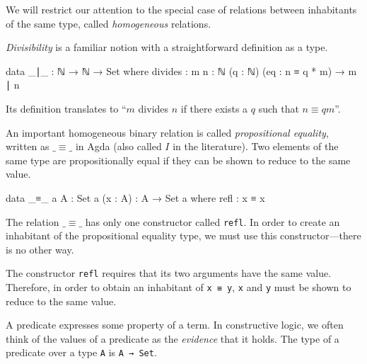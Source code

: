 We will restrict our attention to the special case of relations between inhabitants of the same type, called \emph{homogeneous} relations.

\emph{Divisibility} is a familiar notion with a straightforward definition as a type.

\begin{listing}[h]
\begin{agdacode}
data _∣_ : ℕ → ℕ → Set where
  divides : {m n : ℕ} (q : ℕ) (eq : n ≡ q * m) → m ∣ n
\end{agdacode}
\end{listing}

Its definition translates to \enquote{\(m\) divides \(n\) if there exists a \(q\) such that \(n \equiv q m\)}.

An important homogeneous binary relation is called \emph{propositional equality}, written as \(\_\!\!\equiv\!\!\_\) in Agda (also called \(I\) in the literature). Two elements of the same type are propositionally equal if they can be shown to reduce to the same value.

\begin{listing}[h]
\begin{agdacode}
data _≡_ {a} {A : Set a} (x : A) : A → Set a where
  refl : x ≡ x
\end{agdacode}
\end{listing}

The relation \(\_\!\!\equiv\!\!\_\) has only one constructor called \texttt{refl}. In order to create an inhabitant of the propositional equality type, we must use this constructor---there is no other way.

The constructor \texttt{refl} requires that its two arguments have the same value. Therefore, in order to obtain an inhabitant of \texttt{x ≡ y}, \texttt{x} and \texttt{y} must be shown to reduce to the same value.


A predicate expresses some property of a term. In constructive logic, we often think of the values of a predicate as the \emph{evidence} that it holds. The type of a predicate over a type \texttt{A} is \texttt{A → Set}.

